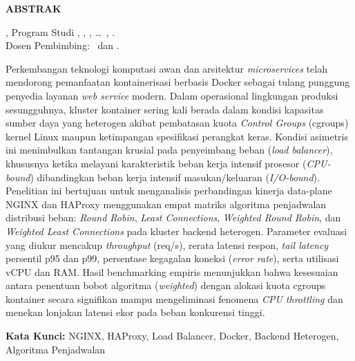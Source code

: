 
\clearpage
{}
\pagestyle{frontstyle}

\begin{center}
    {\fontsize{14pt}{18pt}\selectfont \bfseries ABSTRAK}
\end{center}

\vspace{0.8cm}

\noindent
\skripsiPenulis, Program Studi \skripsiProdi, \skripsiFakultas, \skripsiUniversitas, \dots\ \skripsiTahun, \textit{\skripsiJudul}.\\
Dosen Pembimbing: \skripsiPembimbingSatu\ dan \skripsiPembimbingDua.

\vspace{0.6cm}

\begin{singlespace}
Perkembangan teknologi komputasi awan dan arsitektur \textit{microservices} telah mendorong pemanfaatan kontainerisasi berbasis Docker sebagai tulang punggung penyedia layanan \textit{web service} modern. Dalam operasional lingkungan produksi sesungguhnya, kluster kontainer sering kali berada dalam kondisi kapasitas sumber daya yang heterogen akibat pembatasan kuota \textit{Control Groups} (cgroups) kernel Linux maupun ketimpangan spesifikasi perangkat keras. Kondisi asimetris ini menimbulkan tantangan krusial pada penyeimbang beban (\textit{load balancer}), khususnya ketika melayani karakteristik beban kerja intensif prosesor (\textit{CPU-bound}) dibandingkan beban kerja intensif masukan/keluaran (\textit{I/O-bound}). Penelitian ini bertujuan untuk menganalisis perbandingan kinerja data-plane NGINX dan HAProxy menggunakan empat matriks algoritma penjadwalan distribusi beban: \textit{Round Robin}, \textit{Least Connections}, \textit{Weighted Round Robin}, dan \textit{Weighted Least Connections} pada kluster backend heterogen. Parameter evaluasi yang diukur mencakup \textit{throughput} (req/s), rerata latensi respon, \textit{tail latency} persentil p95 dan p99, persentase kegagalan koneksi (\textit{error rate}), serta utilisasi vCPU dan RAM. Hasil benchmarking empiris menunjukkan bahwa kesesuaian antara penentuan bobot algoritma (\textit{weighted}) dengan alokasi kuota cgroups kontainer secara signifikan mampu mengeliminasi fenomena \textit{CPU throttling} dan menekan lonjakan latensi ekor pada beban konkurensi tinggi.
\end{singlespace}

\vspace{0.8cm}

\noindent
\textbf{Kata Kunci:} NGINX, HAProxy, Load Balancer, Docker, Backend Heterogen, Algoritma Penjadwalan
